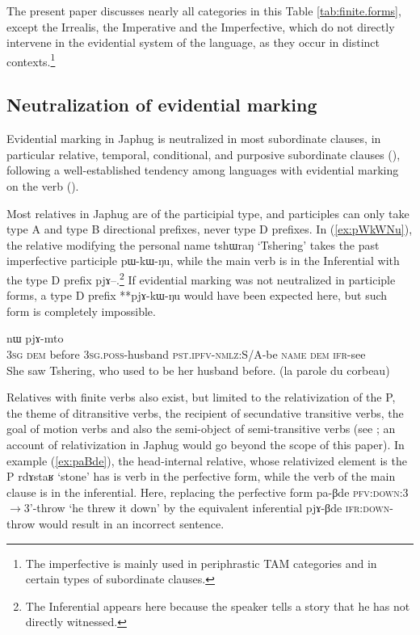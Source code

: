 \documentclass[oldfontcommands,oneside,a4paper,11pt]{article}
\newcommand{\ipa}[1]{{\phon \mbox{#1}}} %
\newcommand{\refb}[1]{(\ref{#1})}
\begin{document}
The present paper discusses nearly all categories in this Table \ref{tab:finite.forms}, except the Irrealis, the Imperative and the Imperfective, which do not directly intervene in the evidential system of the language, as they occur in distinct contexts.\footnote{The imperfective is mainly used in periphrastic TAM categories and in certain types of subordinate clauses.}

\subsection{Neutralization of evidential marking} \label{sec:neutralization}
Evidential marking in Japhug is neutralized in most subordinate clauses, in particular relative, temporal, conditional, and purposive subordinate clauses (\citealt{jacques14linking}), following a well-established tendency among languages with evidential marking on the verb (\citealt[253-6]{aikhenvald06}).

Most relatives in Japhug are of the participial type, and participles can only take type A and type B directional prefixes, never type D prefixes. In \refb{ex:pWkWNu}, the relative modifying the personal name \ipa{tshɯraŋ} `Tshering' takes the past imperfective participle \ipa{pɯ-kɯ-ŋu}, while the main verb is in the Inferential with the type D prefix \ipa{pjɤ--}.\footnote{The Inferential appears here because the speaker tells a story that he has not directly witnessed.} If evidential marking was not neutralized in participle forms, a type D prefix **\ipa{pjɤ-kɯ-ŋu} would have been expected here, but such form is completely impossible.


\begin{exe}
\ex \label{ex:pWkWNu}
\gll [\ipa{ɯʑo} 	\ipa{nɯ} \ipa{ɕɯŋgɯ} 	\ipa{ɯ-nmaʁ}  \ipa{pɯ-kɯ-ŋu}] 	\ipa{tshɯraŋ} 	\ipa{nɯ} 	\ipa{pjɤ-mto} 	\\
\textsc{3sg} \textsc{dem} before \textsc{3sg.poss}-husband \textsc{pst.ipfv-nmlz}:S/A-be \textsc{name} \textsc{dem} \textsc{ifr}-see \\
\glt She saw Tshering, who used to be her husband before. (la parole du corbeau)
\end{exe}

Relatives with finite verbs also exist, but limited to the relativization of the P, the theme of ditransitive verbs, the recipient of secundative transitive verbs, the goal of motion verbs and also the semi-object of semi-transitive verbs (see \citealt{jacques16relatives}; an account of relativization in Japhug would go beyond the scope of this paper). In example \refb{ex:paBde}, the head-internal relative, whose relativized element is the P \ipa{rdɤstaʁ}  `stone' has is verb in the perfective form, while the verb of the main clause is in the inferential. Here, replacing the perfective form \ipa{pa-βde} \textsc{pfv:down}:3$\rightarrow$3'-throw `he threw it down' by the equivalent inferential \ipa{pjɤ-βde}  \textsc{ifr:down}-throw would result in an incorrect sentence.
\end{document}
